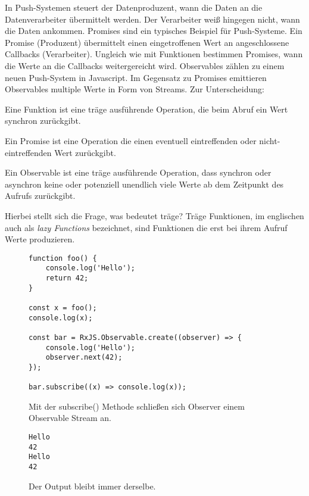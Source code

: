 \noindent
In Push-Systemen steuert der Datenproduzent, wann die Daten an die Datenverarbeiter übermittelt werden. Der Verarbeiter weiß hingegen nicht, wann die Daten ankommen. Promises sind ein typisches Beispiel für Push-Systeme. Ein Promise (Produzent) übermittelt einen eingetroffenen Wert an angeschlossene Callbacks (Verarbeiter). Ungleich wie mit Funktionen bestimmen Promises, wann die Werte an die Callbacks weitergereicht wird. Observables zählen zu einem neuen Push-System in Javascript. Im Gegensatz zu Promises emittieren Observables multiple Werte in Form von Streams. Zur Unterscheidung:

\begin{description}
\item Eine Funktion ist eine träge ausführende Operation, die beim Abruf ein Wert synchron zurückgibt.
\item Ein Promise ist eine Operation die einen eventuell eintreffenden oder nicht-eintreffenden Wert zurückgibt.
\item Ein Observable ist eine träge ausführende Operation, dass synchron oder asynchron keine oder potenziell unendlich viele Werte ab dem Zeitpunkt des Aufrufs zurückgibt.
\end{description}

\noindent
Hierbei stellt sich die Frage, was bedeutet träge? Träge Funktionen, im englischen auch als \textit{lazy Functions} bezeichnet, sind Funktionen die erst bei ihrem Aufruf Werte produzieren\cite{lazy-functions}.

\begin{figure}[H]
\begin{lstlisting}[basicstyle=\small]
function foo() {
    console.log('Hello');
    return 42;
}

const x = foo();
console.log(x);

const bar = RxJS.Observable.create((observer) => {
    console.log('Hello');
    observer.next(42);
});

bar.subscribe((x) => console.log(x));
\end{lstlisting}
\caption{Mit der subscribe() Methode schließen sich Observer einem Observable Stream an.}
\end{figure}

\begin{figure}[H]
\begin{lstlisting}
Hello
42
Hello
42
\end{lstlisting}
\caption{Der Output bleibt immer derselbe.}
\end{figure}

